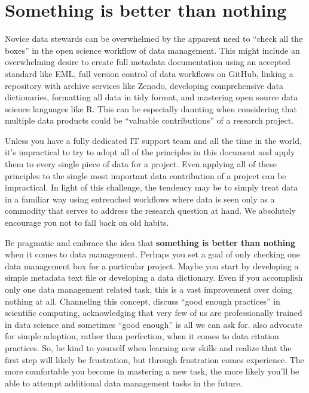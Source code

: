 \documentclass[
]{book}
\begin{document}
\hypertarget{something-is-better-than-nothing}{%
\section{Something is better than nothing}\label{something-is-better-than-nothing}}

Novice data stewards can be overwhelmed by the apparent need to ``check all the boxes'' in the open science workflow of data management. This might include an overwhelming desire to create full metadata documentation using an accepted standard like EML, full version control of data workflows on GitHub, linking a repository with archive services like Zenodo, developing comprehensive data dictionaries, formatting all data in tidy format, and mastering open source data science languages like R. This can be especially daunting when considering that multiple data products could be ``valuable contributions'' of a research project.

Unless you have a fully dedicated IT support team and all the time in the world, it's impractical to try to adopt all of the principles in this document and apply them to every single piece of data for a project. Even applying all of these principles to the single most important data contribution of a project can be impractical. In light of this challenge, the tendency may be to simply treat data in a familiar way using entrenched workflows where data is seen only as a commodity that serves to address the research question at hand. We absolutely encourage you not to fall back on old habits.

Be pragmatic and embrace the idea that \textbf{something is better than nothing} when it comes to data management. Perhaps you set a goal of only checking one data management box for a particular project. Maybe you start by developing a simple metadata text file or developing a data dictionary. Even if you accomplish only one data management related task, this is a vast improvement over doing nothing at all. Channeling this concept, \citet{Wilson17} discuss ``good enough practices'' in scientific computing, acknowledging that very few of us are professionally trained in data science and sometimes ``good enough'' is all we can ask for. \citet{Lowenberg21} also advocate for simple adoption, rather than perfection, when it comes to data citation practices. So, be kind to yourself when learning new skills and realize that the first step will likely be frustration, but through frustration comes experience. The more comfortable you become in mastering a new task, the more likely you'll be able to attempt additional data management tasks in the future.
\end{document}
